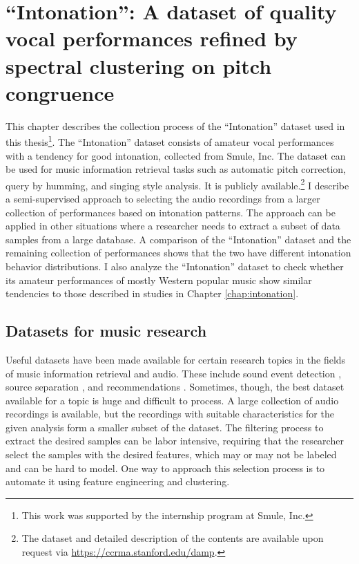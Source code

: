 \chapter{``Intonation'': A dataset of quality vocal performances refined by spectral clustering on pitch congruence}
\label{chap:thesis-damp}
This chapter describes the collection process of the ``Intonation'' dataset used in this thesis\footnote{This work was supported by the internship program at Smule, Inc.}. The ``Intonation'' dataset consists of amateur vocal performances with a tendency for good intonation, collected from Smule, Inc. The dataset can be used for music information retrieval tasks such as automatic pitch correction, query by humming, and singing style analysis. It is publicly available.\footnote{The dataset and detailed description of the contents are available upon request via \url{https://ccrma.stanford.edu/damp}.} I describe a semi-supervised approach to selecting the audio recordings from a larger collection of performances based on intonation patterns. The approach can be applied in other situations where a researcher needs to extract a subset of data samples from a large database. A comparison of the ``Intonation'' dataset and the remaining collection of performances shows that the two have different intonation behavior distributions. I also analyze the ``Intonation'' dataset to check whether its amateur performances of mostly Western popular music show similar tendencies to those described in studies in Chapter \ref{chap:intonation}. 

\section{Datasets for music research}
Useful datasets have been made available for certain research topics in the fields of music information retrieval and audio. These include sound event detection \cite{Mesaros2018_DCASE}, source separation \cite{SiSEC17}, and recommendations \cite{bertin2011million}. Sometimes, though, the best dataset available for a topic is huge and difficult to process. A large collection of audio recordings is available, but the recordings with suitable characteristics for the given analysis form a smaller subset of the dataset. The filtering process to extract the desired samples can be labor intensive, requiring that the researcher select the samples with the desired features, which may or may not be labeled and can be hard to model. One way to approach this selection process is to automate it using feature engineering and clustering. 

